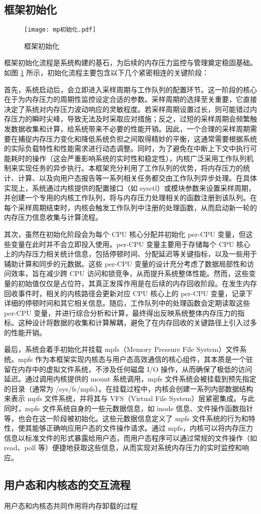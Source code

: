 \subsection{框架初始化}

\begin{figure}[h]
    \centering
    \texttt{[image: mp初始化.pdf]}
    \caption{框架初始化}
    \label{fig:framework_initialization}
\end{figure}

框架初始化流程是系统构建的基石，为后续的内存压力监控与管理奠定稳固基础。如图 \ref{fig:framework_initialization} 所示，初始化流程主要包含以下几个紧密相连的关键阶段：

首先，系统启动后，会立即进入采样周期与工作队列的配置环节。这一阶段的核心在于为内存压力的周期性监控设定合适的参数。采样周期的选择至关重要，它直接决定了系统对内存压力波动响应的灵敏程度。若采样周期设置过长，则可能错过内存压力的瞬时尖峰，导致无法及时采取应对措施；反之，过短的采样周期会频繁触发数据收集和计算，给系统带来不必要的性能开销。因此，一个合理的采样周期需要在捕捉内存压力变化和降低系统负担之间取得精妙的平衡，这通常需要根据系统的实际负载特性和性能需求进行动态调整。同时，为了避免在中断上下文中执行可能耗时的操作（这会严重影响系统的实时性和稳定性），内核广泛采用工作队列机制来实现任务的异步执行。本框架充分利用了工作队列的优势，将内存压力的统计、计算、以及向用户态报告等一系列相关任务都交由工作队列异步处理。在具体实现上，系统通过内核提供的配置接口（如 sysctl）或模块参数来设置采样周期，并创建一个专用的内核工作队列，将与内存压力处理相关的函数注册到该队列。在每个采样周期结束时，内核会触发工作队列中注册的处理函数，从而启动新一轮的内存压力信息收集与计算流程。

其次，虽然在初始化阶段会为每个 CPU 核心分配并初始化 per-CPU 变量，但这些变量在此时并不会立即投入使用。per-CPU 变量主要用于存储每个 CPU 核心上的内存压力相关统计信息，包括停顿时间、分配延迟等关键指标，以及一些用于辅助计算和同步的元数据。这些 per-CPU 变量的设计充分考虑了数据局部性和访问效率，旨在减少跨 CPU 访问和锁竞争，从而提升系统整体性能。然而，这些变量的初始值仅仅是占位符，其真正发挥作用是在后续的内存回收阶段。在发生内存回收事件时，相关的内核路径会更新对应 CPU 核心上的 per-CPU 变量，记录下详细的停顿时间和其它相关信息。随后，工作队列中的处理函数会定期读取这些 per-CPU 变量，并进行综合分析和计算，最终得出反映系统整体内存压力的指标。这种设计将数据的收集和计算解耦，避免了在内存回收的关键路径上引入过多的性能开销。

最后，系统会着手初始化并挂载 mpfs（Memory Pressure File System）文件系统。mpfs 作为本框架实现内核态与用户态高效通信的核心组件，其本质是一个驻留在内存中的虚拟文件系统，不涉及任何磁盘 I/O 操作，从而确保了极低的访问延迟。通过调用内核提供的 mount 系统调用，mpfs 文件系统会被挂载到预先指定的目录（通常为 /sys/fs/mpfs）。在挂载过程中，内核会创建一系列内部数据结构来表示 mpfs 文件系统，并将其与 VFS（Virtual File System）层紧密集成。与此同时，mpfs 文件系统自身的一些元数据信息，如 inode 信息、文件操作函数指针等，也会在这一阶段被初始化。这些元数据信息定义了 mpfs 文件系统的行为和特性，使其能够正确响应用户态的文件操作请求。通过 mpfs，内核可以将内存压力信息以标准文件的形式暴露给用户态，而用户态程序可以通过常规的文件操作（如 read、poll 等）便捷地获取这些信息，从而实现对系统内存压力的实时监控和响应。


\subsection{用户态和内核态的交互流程}

用户态和内核态共同作用将内存卸载的过程

